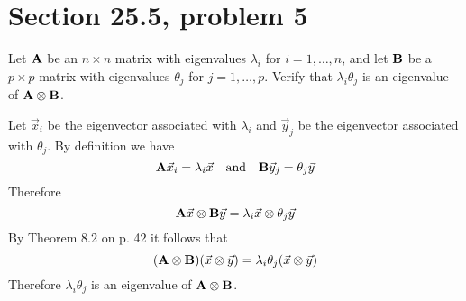 \section{Section 25.5, problem 5}
Let $\bf A$ be an $n\times n$ matrix with eigenvalues $\lambda_i$
for $i=1,\ldots,n$, and let $\bf B$ be a $p\times p$ matrix with
eigenvalues $\theta_j$ for $j=1,\ldots,p$.
Verify that $\lambda_i\theta_j$ is an eigenvalue of
${\bf A}\otimes{\bf B}$.

\bigskip
\noindent
Let $\vec x_i$ be the eigenvector associated with $\lambda_i$
and $\vec y_j$ be the eigenvector associated with $\theta_j$.
By definition we have
$${\bf A}\vec x_i=\lambda_i\vec x\quad\hbox{and}\quad
{\bf B}\vec y_j=\theta_j\vec y$$
Therefore
$${\bf A}\vec x\otimes{\bf B}\vec y
=\lambda_i\vec x\otimes\theta_j\vec y$$
By Theorem 8.2 on p. 42 it follows that
$$({\bf A}\otimes{\bf B})(\vec x\otimes\vec y)
=\lambda_i\theta_j(\vec x\otimes\vec y)$$
Therefore $\lambda_i\theta_j$ is an eigenvalue of
${\bf A}\otimes{\bf B}$.
